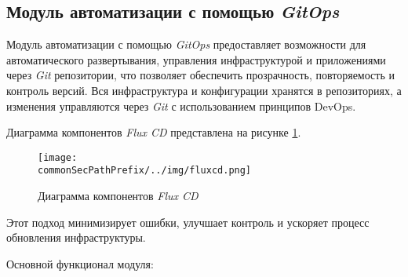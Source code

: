 \subsection{Модуль автоматизации с помощью \textit{GitOps}}
\label{sec:gitops_automation_functionality}

Модуль автоматизации с помощью \textit{GitOps} предоставляет возможности для автоматического развертывания, управления инфраструктурой и приложениями через \textit{Git} репозитории, что позволяет обеспечить прозрачность, повторяемость и контроль версий. Вся инфраструктура и конфигурации хранятся в репозиториях, а изменения управляются через \textit{Git} с использованием принципов DevOps. 

Диаграмма компонентов \textit{Flux CD} представлена на рисунке \ref{fig:gitops_automation_functionality:fluxcd.png}.
\begin{figure}[ht]
    \centering
    \texttt{[image: \\commonSecPathPrefix/../img/fluxcd.png]}
    \caption{Диаграмма компонентов \textit{Flux CD}}
    \label{fig:gitops_automation_functionality:fluxcd.png}
\end{figure}

Этот подход минимизирует ошибки, улучшает контроль и ускоряет процесс обновления инфраструктуры.

Основной функционал модуля:

